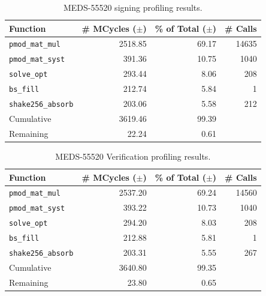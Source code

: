 \documentclass[11pt,a4paper]{report}
\theoremstyle{definition}
\begin{document}
\begin{table}[]
  \centering
  \begin{tabular}{lrrr}
    \toprule
    \textbf{Function} & \textbf{\# MCycles} ($\pm$) & \textbf{\% of Total} ($\pm$) & \textbf{\# Calls} \\
    \midrule
      \texttt{pmod\_mat\_mul} & 2518.85 & 69.17 & 14635 \\
      \texttt{pmod\_mat\_syst} & 391.36 & 10.75 & 1040 \\
      \texttt{solve\_opt} & 293.44 & 8.06 & 208 \\
      \texttt{bs\_fill} & 212.74 & 5.84 & 1 \\
      \texttt{shake256\_absorb} & 203.06 & 5.58 & 212 \\
    \midrule
      Cumulative & 3619.46 & 99.39 & \\
      Remaining & 22.24 & 0.61 & \\
    \bottomrule
  \end{tabular}
  \caption{MEDS-55520 signing profiling results.}
  \label{tab:medssigningfunctions}
\end{table}

\begin{table}[]
  \centering
  \begin{tabular}{lrrr}
    \toprule
    \textbf{Function} & \textbf{\# MCycles} ($\pm$) & \textbf{\% of Total} ($\pm$) & \textbf{\# Calls} \\
    \midrule
      \texttt{pmod\_mat\_mul} & 2537.20 & 69.24 & 14560 \\
      \texttt{pmod\_mat\_syst} & 393.22 & 10.73 & 1040 \\
      \texttt{solve\_opt} & 294.20 & 8.03 & 208 \\
      \texttt{bs\_fill} & 212.88 & 5.81 & 1 \\
      \texttt{shake256\_absorb} & 203.31 & 5.55 & 267 \\
    \midrule
      Cumulative & 3640.80 & 99.35 & \\
      Remaining & 23.80 & 0.65 & \\
    \bottomrule
  \end{tabular}
  \caption{MEDS-55520 Verification profiling results.}
  \label{tab:medsverificationfunctions}
\end{table}

\end{document}
